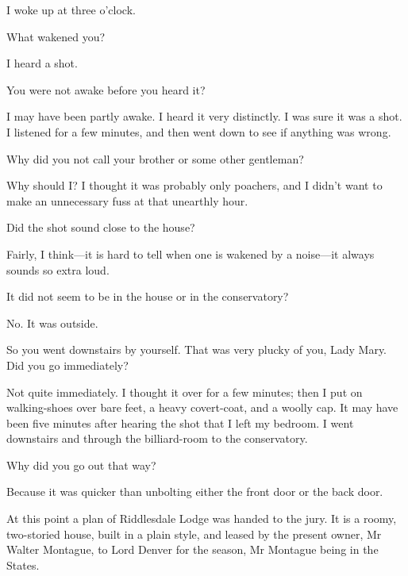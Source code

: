 \begin{dialogue}
 I woke up at three o'clock.

 What wakened you?

 I heard a shot.

 You were not awake before you heard it?

 I may have been partly awake. I heard it very distinctly. I was sure it was a shot. I listened for a few minutes, and then went down to see if anything was wrong.

 Why did you not call your brother or some other gentleman?

  Why should I? I thought it was probably only poachers, and I didn't want to make an unnecessary fuss at that unearthly hour.

 Did the shot sound close to the house?

 Fairly, I think—it is hard to tell when one is wakened by a noise—it always sounds so extra loud.

 It did not seem to be in the house or in the conservatory?

 No. It was outside.

 So you went downstairs by yourself. That was very plucky of you, Lady Mary. Did you go immediately?

 Not quite immediately. I thought it over for a few minutes; then I put on walking-shoes over bare feet, a heavy covert-coat, and a woolly cap. It may have been five minutes after hearing the shot that I left my bedroom. I went downstairs and through the billiard-room to the conservatory.

 Why did you go out that way?

 Because it was quicker than unbolting either the front door or the back door.
\end{dialogue}

At this point a plan of Riddlesdale Lodge was handed to the jury. It is a roomy, two-storied house, built in a plain style, and leased by the present owner, Mr Walter Montague, to Lord Denver for the season, Mr  Montague being in the States.

